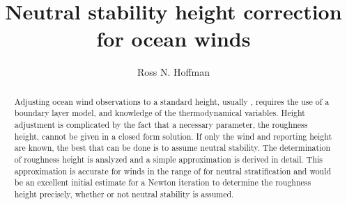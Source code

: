 \documentclass[12pt,notitlepage]{article}
\begin{document}
\title{Neutral stability height correction for ocean winds}

\author{Ross N. Hoffman\footnotemark[1]}


\maketitle


\begin{abstract}

Adjusting ocean wind observations to a standard height, usually
, requires the use of a boundary layer model, and knowledge of
the thermodynamical variables.
Height adjustment is complicated by the fact that a necessary
parameter, the roughness height, cannot be given in a closed form
solution.
If only the wind and reporting height are known, the best that can be
done is to assume neutral stability.
The determination of roughness height is analyzed and a simple
approximation \citep[used by][]{AtlHA+11} is derived in detail.
This approximation is accurate for winds in the range of 
for neutral stratification and would be an excellent initial estimate
for a Newton iteration to determine the roughness height precisely,
whether or not neutral stability is assumed.

\end{abstract}

\end{document}
